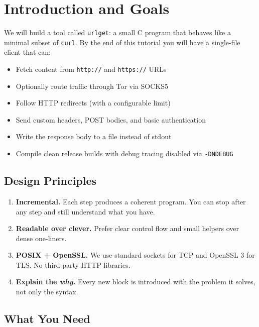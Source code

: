 \section{Introduction and Goals}

We will build a tool called \texttt{urlget}: a small C program that behaves
like a minimal subset of \texttt{curl}. By the end of this tutorial you will
have a single-file client that can:

\begin{itemize}[leftmargin=1.4em]
    \item Fetch content from \texttt{http://} and \texttt{https://} URLs
    \item Optionally route traffic through Tor via SOCKS5
    \item Follow HTTP redirects (with a configurable limit)
    \item Send custom headers, POST bodies, and basic authentication
    \item Write the response body to a file instead of stdout
    \item Compile clean release builds with debug tracing disabled via
          \texttt{-DNDEBUG}
\end{itemize}

\subsection{Design Principles}

\begin{enumerate}[leftmargin=1.4em]
    \item \textbf{Incremental.} Each step produces a coherent program. You can
          stop after any step and still understand what you have.
    \item \textbf{Readable over clever.} Prefer clear control flow and small
          helpers over dense one-liners.
    \item \textbf{POSIX + OpenSSL.} We use standard sockets for TCP and
          OpenSSL 3 for TLS. No third-party HTTP libraries.
    \item \textbf{Explain the \emph{why}.} Every new block is introduced with
          the problem it solves, not only the syntax.
\end{enumerate}

\subsection{What You Need}

